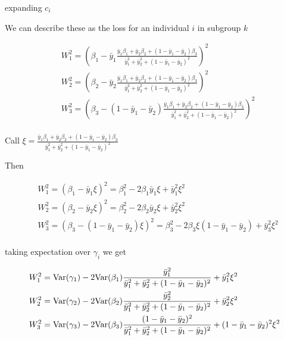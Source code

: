 expanding $c_i$ 

We can describe these as the loss for an individual $i$ in subgroup $k$ 

\begin{align*}
		  &W_1^2=  \left( \beta_1 -  \bar{y}_1\frac{ \bar{y}_1 \beta_1 + \bar{y}_2 \beta_2 + (1 - \bar{y}_1 - \bar{y}_2) \beta_3 }{\bar{y}_1^2 + \bar{y}_2^2 + (1 - \bar{y}_1 - \bar{y}_2 )^2} \right)^2 \\
		  &W_2^2= \left( \beta_2 -  \bar{y}_2\frac{ \bar{y}_1 \beta_1 +  \bar{y}_2 \beta_2 + (1 - \bar{y}_1 - \bar{y}_2) \beta_3 }{\bar{y}_1^2 + \bar{y}_2^2 + (1 - \bar{y}_1 - \bar{y}_2 )^2} \right)^2 \\
		  &W_3^2 = \left( \beta_3 - (1 - \bar{y}_1 - \bar{y}_2)\frac{ \bar{y}_1 \beta_1 +\bar{y}_2 \beta_2 + (1 - \bar{y}_1 - \bar{y}_2) \beta_3 }{\bar{y}_1^2 + \bar{y}_2^2 + (1 - \bar{y}_1 - \bar{y}_2 )^2} \right)^2 \\
\end{align*} 


Call $\xi = \frac{ \bar{y}_1 \beta_1 + \bar{y}_2 \beta_2 + (1 - \bar{y}_1 - \bar{y}_2) \beta_3 }{\bar{y}_1^2 + \bar{y}_2^2 + (1 - \bar{y}_1 - \bar{y}_2 )^2}$

Then 

\begin{align*}
		  &W_1^2=  \left( \beta_1 -  \bar{y}_1 \xi \right)^2 = \beta_1^2 - 2 \beta_1 \bar{y}_1 \xi + \bar{y}_1^2 \xi^2 \\
		  &W_2^2= \left( \beta_2 -  \bar{y}_2 \xi \right)^2 = \beta_2^2 - 2 \beta_2 \bar{y}_2 \xi + \bar{y}_2^2 \xi^2 \\
		  &W_3^2 = \left( \beta_3 - (1 - \bar{y}_1 - \bar{y}_2) \xi \right)^2 = \beta_3^2 - 2 \beta_3 \xi(1 - \bar{y}_1 - \bar{y}_2)  + \bar{y}_3^2 \xi^2 \\
\end{align*} 

taking expectation over $\gamma_i$ we get

\begin{align*}
		  &W_1^2=  \mathrm{Var}(\gamma_1) - 2 \mathrm{Var}(\beta_1) \frac{\bar{y}_1^2}{\bar{y}_1^2 + \bar{y}_2^2 + (1 - \bar{y}_1 - \bar{y}_2 )^2} + \bar{y}_1^2 \xi^2 \\
		  &W_2^2=  \mathrm{Var}(\gamma_2) - 2 \mathrm{Var}(\beta_2) \frac{\bar{y}_2^2}{\bar{y}_1^2 + \bar{y}_2^2 + (1 - \bar{y}_1 - \bar{y}_2 )^2} + \bar{y}_2^2 \xi^2 \\
		  &W_3^2=  \mathrm{Var}(\gamma_3) - 2 \mathrm{Var}(\beta_3) \frac{(1 - \bar{y}_1 - \bar{y}_2)^2}{\bar{y}_1^2 + \bar{y}_2^2 + (1 - \bar{y}_1 - \bar{y}_2 )^2} + (1 - \bar{y}_1 - \bar{y}_2)^2 \xi^2 \\
\end{align*}

